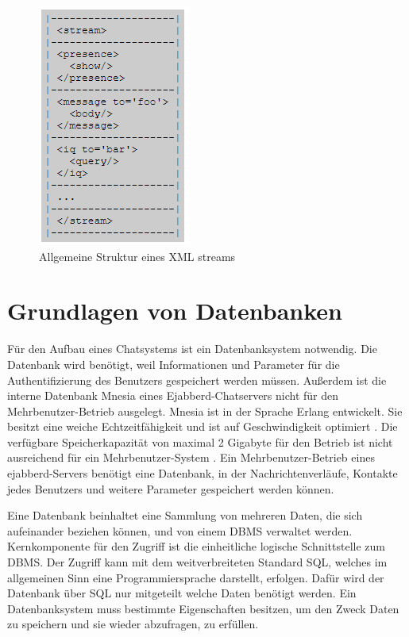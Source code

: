 \documentclass[a4paper,titlepage,halfparskip,12pt]{scrreprt}
\begin{document}
\begin{onehalfspacing}
\begin{figure}[h]
	\includegraphics[scale=1.2]{images/XML_Stream}
	\caption{Allgemeine Struktur eines XML streams}
	\label{img:StrukturXMLstream}
\end{figure}
\newpage


\section{Grundlagen von Datenbanken}
\label{sec:Datenbank}
Für den Aufbau eines Chatsystems ist ein Datenbanksystem notwendig. Die Datenbank wird benötigt, weil Informationen und Parameter für die Authentifizierung des Benutzers gespeichert werden müssen. Außerdem ist die interne Datenbank Mnesia eines Ejabberd-Chatservers nicht für den Mehrbenutzer-Betrieb ausgelegt. Mnesia ist in der Sprache Erlang entwickelt. Sie besitzt eine weiche Echtzeitfähigkeit und ist auf Geschwindigkeit optimiert \cite{MnesiaDoc}. Die verfügbare Speicherkapazität von maximal 2 Gigabyte für den Betrieb ist nicht ausreichend für ein Mehrbenutzer-System \cite{ejabberdDoc}. Ein Mehrbenutzer-Betrieb eines ejabberd-Servers benötigt eine Datenbank, in der Nachrichtenverläufe, Kontakte jedes Benutzers und weitere Parameter gespeichert werden können.

\pagebreak

Eine Datenbank beinhaltet eine Sammlung von mehreren Daten, die sich aufeinander beziehen können, und von einem \ac{DBMS} verwaltet werden. Kernkomponente für den Zugriff ist die einheitliche logische Schnittstelle zum \ac{DBMS}. Der Zugriff kann mit dem weitverbreiteten Standard \ac{SQL}, welches im allgemeinen Sinn eine Programmiersprache darstellt, erfolgen. Dafür wird der Datenbank über \ac{SQL} nur mitgeteilt welche Daten benötigt werden. Ein Datenbanksystem muss bestimmte Eigenschaften besitzen, um den Zweck Daten zu speichern und sie wieder abzufragen, zu erfüllen.


\end{onehalfspacing}
\end{document}
